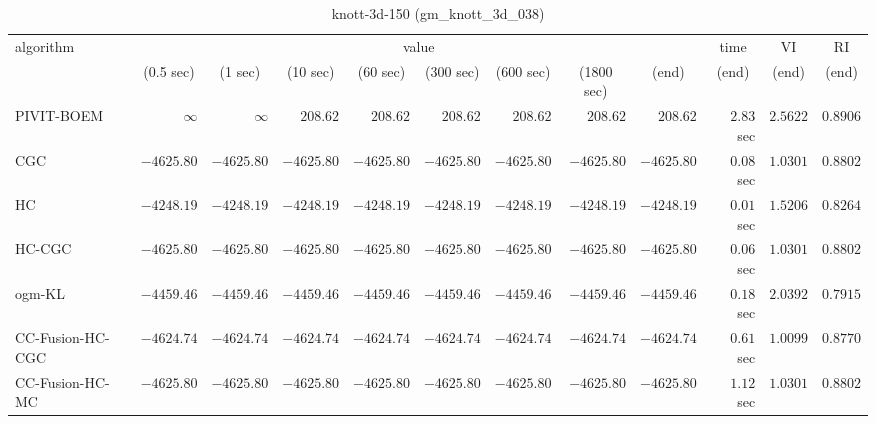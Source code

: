 \begin{table}[H]
\scriptsize
\centering
\caption{knott-3d-150 (gm\_knott\_3d\_038)}
\label{tab:anytimetable-knott-3d-150-gm-knott-3d-038}
\begin{tabular}{lrrrrrrrrrrr}
\toprule
           algorithm &                                   \multicolumn{8}{c}{value} & \multicolumn{1}{c}{time}    & \multicolumn{1}{c}{VI}  & \multicolumn{1}{c}{RI} \\  
\cmidrule(lr){2-9}\cmidrule(lr){10-10} \cmidrule(lr){11-11} \cmidrule(lr){12-12}   
                     & \multicolumn{1}{c}{(0.5 sec)} & \multicolumn{1}{c}{(1 sec)} & \multicolumn{1}{c}{(10 sec)} & \multicolumn{1}{c}{(60 sec)} & \multicolumn{1}{c}{(300 sec)} & \multicolumn{1}{c}{(600 sec)} & \multicolumn{1}{c}{(1800 sec)} & \multicolumn{1}{c}{(end)} & \multicolumn{1}{c}{(end)}    & \multicolumn{1}{c}{(end)}   & \multicolumn{1}{c}{(end)}  \\ \midrule 
          PIVIT-BOEM & $\infty$ & $\infty$ & $       208.62$ & $       208.62$ & $       208.62$ & $       208.62$ & $       208.62$ & $       208.62$ & $         2.83$ sec    & $       2.5622$  & $       0.8906$ \\ 
                 CGC & $     -4625.80$ & $     -4625.80$ & $     -4625.80$ & $     -4625.80$ & $     -4625.80$ & $     -4625.80$ & $     -4625.80$ & $     -4625.80$ & $         0.08$ sec    & $       1.0301$  & $       0.8802$ \\ 
                  HC & $     -4248.19$ & $     -4248.19$ & $     -4248.19$ & $     -4248.19$ & $     -4248.19$ & $     -4248.19$ & $     -4248.19$ & $     -4248.19$ & $         0.01$ sec    & $       1.5206$  & $       0.8264$ \\ 
              HC-CGC & $     -4625.80$ & $     -4625.80$ & $     -4625.80$ & $     -4625.80$ & $     -4625.80$ & $     -4625.80$ & $     -4625.80$ & $     -4625.80$ & $         0.06$ sec    & $       1.0301$  & $       0.8802$ \\ 
              ogm-KL & $     -4459.46$ & $     -4459.46$ & $     -4459.46$ & $     -4459.46$ & $     -4459.46$ & $     -4459.46$ & $     -4459.46$ & $     -4459.46$ & $         0.18$ sec    & $       2.0392$  & $       0.7915$ \\ 
    CC-Fusion-HC-CGC & $     -4624.74$ & $     -4624.74$ & $     -4624.74$ & $     -4624.74$ & $     -4624.74$ & $     -4624.74$ & $     -4624.74$ & $     -4624.74$ & $         0.61$ sec    & $       1.0099$  & $       0.8770$ \\ 
     CC-Fusion-HC-MC & $     -4625.80$ & $     -4625.80$ & $     -4625.80$ & $     -4625.80$ & $     -4625.80$ & $     -4625.80$ & $     -4625.80$ & $     -4625.80$ & $         1.12$ sec    & $       1.0301$  & $       0.8802$ \\ 

\end{tabular}
\end{table}
